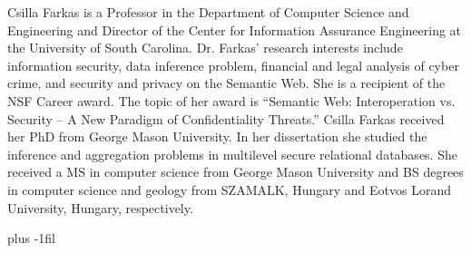 \begin{IEEEbiography}
    {Csilla Farkas} is a Professor in the Department of Computer Science and Engineering and Director of the Center for Information Assurance Engineering at the University of South Carolina. Dr. Farkas’ research interests include information security, data inference problem, financial and legal analysis of cyber crime, and security and privacy on the Semantic Web. She is a recipient of the NSF Career award. The topic of her award is “Semantic Web: Interoperation vs. Security – A New Paradigm of Confidentiality Threats.” Csilla Farkas received her PhD from George Mason University. In her dissertation she studied the inference and aggregation problems in multilevel secure relational databases. She received a MS in computer science from George Mason University and BS degrees in computer science and geology from SZAMALK, Hungary and Eotvos Lorand University, Hungary, respectively.
\end{IEEEbiography}
\baselineskip plus -1fil
